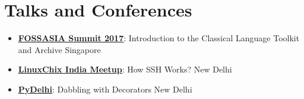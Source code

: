 \documentclass[letterpaper,11pt]{article}
\newcommand{\resumeItem}[2]{
  \item\small{
    \textbf{#1}{: #2 \vspace{-2pt}}
  }
}
\newcommand{\resumeSubItem}[2]{\resumeItem{#1}{#2}\vspace{-4pt}}
\newcommand{\resumeSubHeadingListStart}{\begin{itemize}[leftmargin=*]}
\newcommand{\resumeSubHeadingListEnd}{\end{itemize}}
\begin{document}
\section{Talks and Conferences}
 \resumeSubHeadingListStart
    \resumeSubItem{\href{https://2017.fossasia.org/tracks.html\#2891}{\underline{FOSSASIA Summit 2017}}}{Introduction to the Classical Language Toolkit and Archive}\hfill{Singapore}
    \resumeSubItem{\href{https://github.com/linuxchixin/talks}{\underline{LinuxChix India Meetup}}}
       {How SSH Works?}\hfill{New Delhi}
    \resumeSubItem{\href{https://www.meetup.com/pydelhi/events/mglhqpyxhbqb/}{\underline{PyDelhi}}}
       {Dabbling with Decorators}\hfill{New Delhi}
 \resumeSubHeadingListEnd
\end{document}
